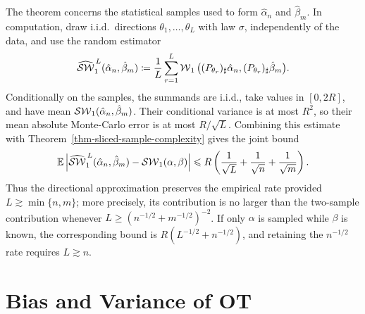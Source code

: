\begin{rem}\label{rem-sliced-direction-sample-budget}
	The theorem concerns the statistical samples used to form \(\hat\alpha_n\) and \(\hat\beta_m\). In computation, draw i.i.d.\ directions \(\theta_1,\ldots,\theta_L\) with law \(\sigma\), independently of the data, and use the random estimator
	\begin{equation}\label{eq-empirical-direction-sliced-w1}
		\widehat{\operatorname{\mathcal{SW}}}_1^{\,L}(\hat\alpha_n,\hat\beta_m)
		\coloneqq
		\frac1L\sum_{r=1}^L
		\operatorname{\mathcal{W}}_1\big((P_{\theta_r})_\sharp\hat\alpha_n,
		(P_{\theta_r})_\sharp\hat\beta_m\big).
	\end{equation}
	Conditionally on the samples, the summands are i.i.d., take values in \([0,2R]\), and have mean \(\operatorname{\mathcal{SW}}_1(\hat\alpha_n,\hat\beta_m)\). Their conditional variance is at most \(R^2\), so their mean absolute Monte-Carlo error is at most \(R/\sqrt L\). Combining this estimate with Theorem~\ref{thm-sliced-sample-complexity} gives the joint bound
	\begin{equation}\label{eq-sliced-joint-sample-direction-rate}
		\mathbb{E}\left\lvert
		\widehat{\operatorname{\mathcal{SW}}}_1^{\,L}(\hat\alpha_n,\hat\beta_m)
		-\operatorname{\mathcal{SW}}_1(\alpha,\beta)\right\rvert
		\leqslant
		R\left(\frac1{\sqrt L}+\frac1{\sqrt n}+\frac1{\sqrt m}\right).
	\end{equation}
	Thus the directional approximation preserves the empirical rate provided
	\(L\gtrsim\min\{n,m\}\); more precisely, its contribution is no larger than the two-sample contribution whenever
	\(L\geq(n^{-1/2}+m^{-1/2})^{-2}\).
	If only \(\alpha\) is sampled while \(\beta\) is known, the corresponding bound is
	\(R(L^{-1/2}+n^{-1/2})\), and retaining the \(n^{-1/2}\) rate requires \(L\gtrsim n\).
\end{rem}

\section{Bias and Variance of OT}
\label{sec-bias-variance-ot}

